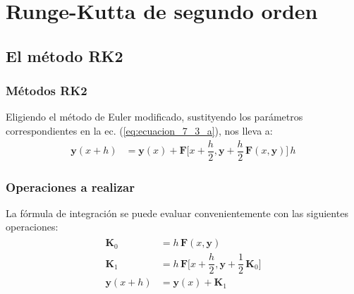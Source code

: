 \documentclass[12pt]{beamer}
\begin{document}
\section{Runge-Kutta de segundo orden}
\subsection{El método RK2}

\begin{frame}
\frametitle{Métodos RK2}
Eligiendo el método de Euler modificado, sustityendo los parámetros correspondientes en la ec. (\ref{eq:ecuacion_7_3_a}), nos lleva a:
\pause
\begin{align}
\mathbf{y} (x + h) &= \mathbf{y} (x) + \mathbf{F} \bigg[ x + \dfrac{h}{2}, \mathbf{y} + \dfrac{h}{2} \, \mathbf{F} (x , \mathbf{y}) \bigg] \, h
\label{eq:ecuacion_7_3_f}
\end{align}
\end{frame}
\begin{frame}
\frametitle{Operaciones a realizar}
La fórmula de integración se puede evaluar convenientemente con las siguientes operaciones:
\pause
\begin{align}
\begin{aligned}
\mathbf{K}_{0} &= h \, \mathbf{F} (x, \mathbf{y}) \\
\mathbf{K}_{1} &= h \, \mathbf{F} \bigg[ x + \dfrac{h}{2}, \mathbf{y} + \dfrac{1}{2} \, \mathbf{K}_{0} \bigg] \\
\mathbf{y} (x + h) &= \mathbf{y} (x) + \mathbf{K}_{1}
\end{aligned}
\label{eq:ecuacion_07_09}
\end{align}
\end{frame}
\end{document}
